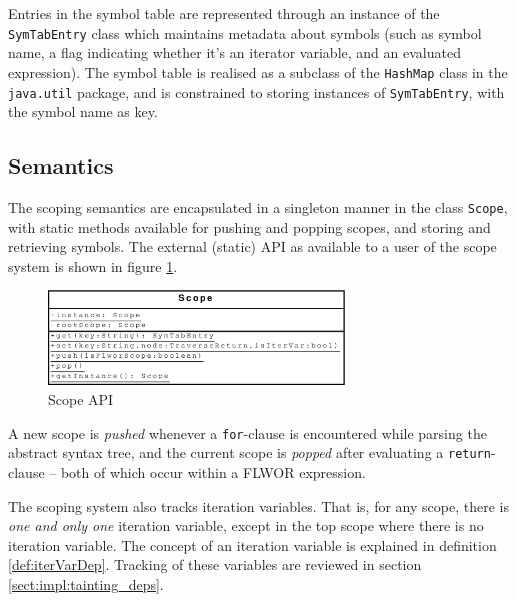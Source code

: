 Entries in the symbol table are represented through an instance of the
\texttt{SymTabEntry} class which maintains metadata about symbols (such as
symbol name, a flag indicating whether it's an iterator variable, and an
evaluated expression). The symbol table is realised as a subclass of the
\texttt{HashMap} class in the \texttt{java.util} package, and is constrained to
storing instances of \texttt{SymTabEntry}, with the symbol name as key.

\subsection{Semantics}
The scoping semantics are encapsulated in a singleton manner in the class
\texttt{Scope}, with static methods available for pushing and popping scopes,
and storing and retrieving symbols. The external (static) API as available to a
user of the scope system is shown in figure \ref{fig:impl:scope_uml}.

\begin{figure}[!htp]
\begin{center}
  \includegraphics[width=0.7\textwidth]{diagrams/scope_uml}
  \caption{Scope API}
  \label{fig:impl:scope_uml}
\end{center}
\end{figure}

A new scope is \textit{pushed} whenever a \texttt{for}-clause is encountered while
parsing the abstract syntax tree, and the current scope is \textit{popped} after
evaluating a \texttt{return}-clause -- both of which occur within a FLWOR expression.

The scoping system also tracks iteration variables. That is, for any scope,
there is \textit{one and only one} iteration variable, except in the top scope
where there is no iteration variable. The concept of an iteration variable is
explained in definition \ref{def:iterVarDep}. Tracking of these
variables are reviewed in section \ref{sect:impl:tainting_deps}.